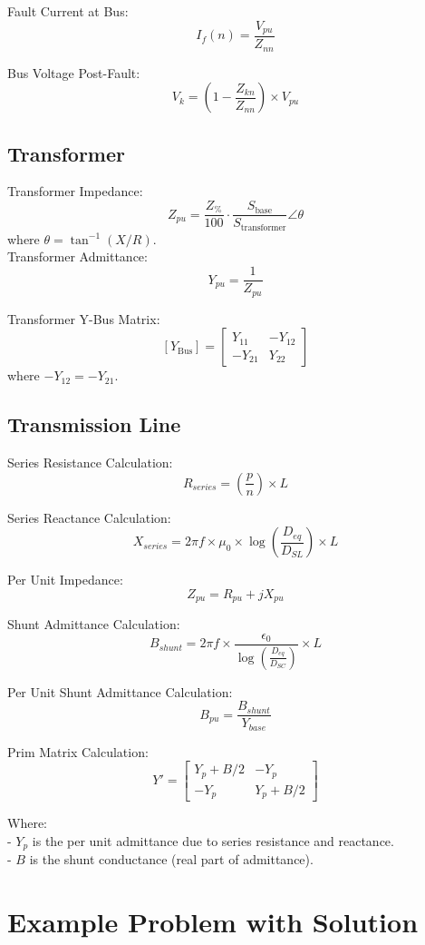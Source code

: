 \documentclass{article}
\begin{document}
	\noindent
	Fault Current at Bus: 
	\[
	I_f(n) = \frac{V_{pu}}{Z_{nn}}
	\]
	
	\noindent
	Bus Voltage Post-Fault: 
	\[
	V_k = (1 - \frac{ Z_{kn} }{ Z_{nn} }) \times V_{pu}
	\]
	
	\subsection*{Transformer}
	\noindent
	Transformer Impedance:
	\[ Z_{pu} = \frac{Z_\%}{100} \cdot \frac{S_{\text{base}}}{S_{\text{transformer}}} \angle{\theta} \]
	where \( \theta = \tan^{-1}(X/R) \). \\
	
	\noindent
	Transformer Admittance:
	\[ Y_{pu} = \frac{1}{Z_{pu}} \]
	
	\noindent
	Transformer Y-Bus Matrix:
	\[ [Y_{\text{Bus}}] = 
	\begin{bmatrix}
		Y_{11} & -Y_{12} \\
		-Y_{21} & Y_{22}
	\end{bmatrix} \]
	where \( -Y_{12} = -Y_{21} \).
	
	\subsection*{Transmission Line}
	Series Resistance Calculation: 
	\[
	R_{series} = (\frac{p}{n}) \times L
	\]
	
	\noindent	
	Series Reactance Calculation: 
	\[
	X_{series} = 2 \pi f \times \mu_0 \times \log(\frac{D_{eq}}{D_{SL}}) \times L
	\]
	
	\noindent
	Per Unit Impedance: 
	\[
	Z_{pu} = R_{pu} + j X_{pu}
	\]
	
	\noindent
	Shunt Admittance Calculation: 
	\[
	B_{shunt} = 2 \pi f \times \frac{\epsilon_0}{\log(\frac{D_{eq}}{D_{SC}})} \times L
	\]
	
	\noindent
	Per Unit Shunt Admittance Calculation: 
	\[
	B_{pu} = \frac{B_{shunt}}{Y_{base}}
	\]
	
	\noindent	
	Prim Matrix Calculation:
	\[
	Y' = \begin{bmatrix}
		Y_p + B/2 & -Y_p \\
		-Y_p & Y_p + B/2
	\end{bmatrix}
	\]
	
	\noindent
	Where: \\
	- \(Y_p\) is the per unit admittance due to series resistance and reactance. \\
	- \(B\) is the shunt conductance (real part of admittance).
	
	\section{Example Problem with Solution}
	
	
\end{document}
